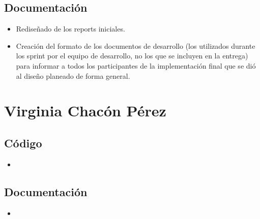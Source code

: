\documentclass[../FINAL/Scrum/SCRUM.tex]{subfiles}
\begin{document}
\subsection*{Documentación}
\begin{itemize}
\item Rediseñado de los reports iniciales.
\item Creación del formato de los documentos de desarrollo (los utilizados durante los sprint por el equipo de desarrollo, no los que se incluyen en la entrega) para informar a todos los participantes de la implementación final que se dió al diseño planeado de forma general.
\end{itemize}

\section{Virginia Chacón Pérez}
\subsection*{Código}
\begin{itemize}
\item 
\end{itemize}
\subsection*{Documentación}
\begin{itemize}
\item 
\end{itemize}
\end{document}

